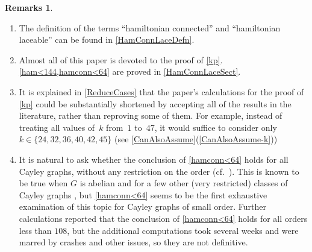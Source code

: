 \documentclass[]{amcjoucc}
\makeatletter
\newcommand{\fullcsee}[2]{\textup(see \fullcref{#1}{#2}\textup)}
\renewcommand{\Cref}{\cref}
\newcommand{\pref}[1]{(\ref{#1})}
\newcommand{\fullcref}[2]{\cref{#1}\pref{#1-#2}}
\theoremstyle{plain}
\theoremstyle{definition}
\theoremstyle{definition}
\newtheorem{rems}[equation]{Remarks}
\newcommand{\noprelistbreak}{\smallskip\@nobreaktrue\nopagebreak}
\makeatother
\begin{document}
\begin{rems} \ 
\noprelistbreak
	\begin{enumerate}
	
	\item The definition of the terms ``hamiltonian connected'' and ``hamiltonian laceable'' can be found in \cref{HamConnLaceDefn}.
	
	\item Almost all of this paper is devoted to the proof of \cref{kp}. \Cref{ham<144,hamconn<64} are proved in \cref{HamConnLaceSect}.
	
	\item It is explained in \cref{ReduceCases} that the paper's calculations for the proof of \cref{kp} could be substantially shortened by accepting all of the results in the literature, rather than reproving some of them. For example, instead of treating all values of~$k$ from~$1$ to~$47$, it would suffice to consider only $k \in \{24, 32, 36, 40, 42, 45\}$ \fullcsee{CanAlsoAssume}{k}
	
	\item It is natural to ask whether the conclusion of \cref{hamconn<64} holds for all Cayley graphs, without any restriction on the order (cf.\ \cite[Questions 4.1 and~4.3, pp.~121--122]{DupuisWagon-Laceable}). This is known to be true when $G$ is abelian \cite{ChenQuimpo} and for a few other (very restricted) classes of Cayley graphs \cite{Alspach-CoxeterI, AlspachChenMcAveney-HamLace, AlspachQin-HamConn, Araki-HyperHamLace}, but \cref{hamconn<64} seems to be the first exhaustive examination of this topic for Cayley graphs of small order.
	Further calculations reported that the conclusion of \cref{hamconn<64} holds for all orders less than $108$, but the additional computations took several weeks and were marred by crashes and other issues, so they are not definitive.

	\end{enumerate}
\end{rems}
\end{document}
